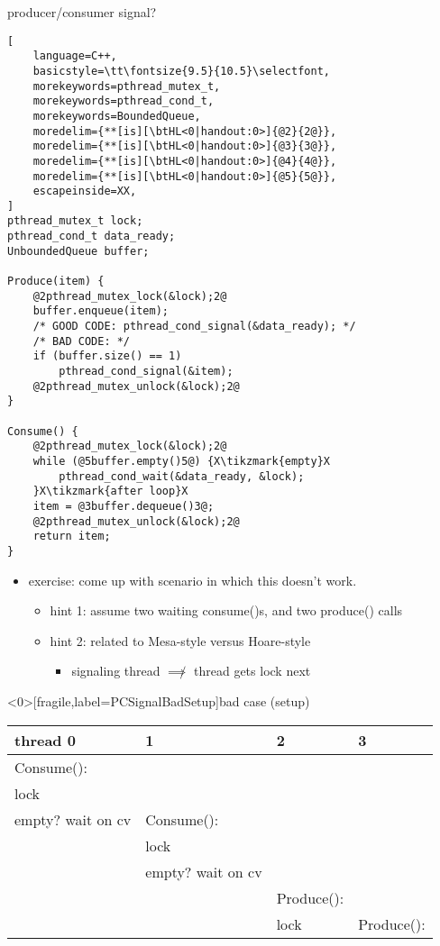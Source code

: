 \begin{frame}[fragile,label=PCSignal]{producer/consumer signal?}
\begin{lstlisting}[
    language=C++,
    basicstyle=\tt\fontsize{9.5}{10.5}\selectfont,
    morekeywords=pthread_mutex_t,
    morekeywords=pthread_cond_t,
    morekeywords=BoundedQueue,
    moredelim={**[is][\btHL<0|handout:0>]{@2}{2@}}, 
    moredelim={**[is][\btHL<0|handout:0>]{@3}{3@}}, 
    moredelim={**[is][\btHL<0|handout:0>]{@4}{4@}}, 
    moredelim={**[is][\btHL<0|handout:0>]{@5}{5@}}, 
    escapeinside=XX,
]
pthread_mutex_t lock;
pthread_cond_t data_ready;
UnboundedQueue buffer;

Produce(item) {
    @2pthread_mutex_lock(&lock);2@
    buffer.enqueue(item);
    /* GOOD CODE: pthread_cond_signal(&data_ready); */
    /* BAD CODE: */
    if (buffer.size() == 1)
        pthread_cond_signal(&item);
    @2pthread_mutex_unlock(&lock);2@
}

Consume() {
    @2pthread_mutex_lock(&lock);2@
    while (@5buffer.empty()5@) {X\tikzmark{empty}X
        pthread_cond_wait(&data_ready, &lock);
    }X\tikzmark{after loop}X
    item = @3buffer.dequeue()3@;
    @2pthread_mutex_unlock(&lock);2@
    return item;
}
\end{lstlisting}
\begin{itemize}
    \item exercise: come up with scenario in which this doesn't work.
        \begin{itemize}
        \item hint 1: assume two waiting consume()s, and two produce() calls
        \item hint 2: related to Mesa-style versus Hoare-style 
            \begin{itemize}
            \item signaling thread $\not\implies$ thread gets lock next
            \end{itemize}
        \end{itemize}
\end{itemize}
\end{frame}

\begin{frame}<0>[fragile,label=PCSignalBadSetup]{bad case (setup)}
\fontsize{12}{13}\selectfont
\begin{tabular}{l|l|l|l}
thread 0 & 1 & 2 & 3 \\ \hline
Consume(): & & \\
lock & & \\
empty? wait on cv & Consume(): \\
     & lock & \\
     & empty? wait on cv & & \\
     & & Produce(): & \\
     & & lock & Produce(): \\
\end{tabular}
\end{frame}

